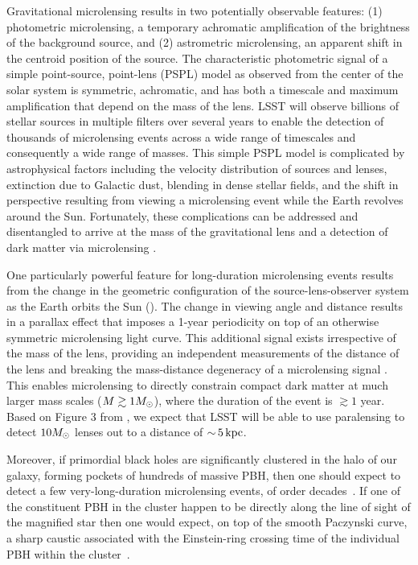 Gravitational microlensing results in two potentially observable features: (1) photometric microlensing, a temporary achromatic amplification of the brightness of the background source, and (2) astrometric microlensing, an apparent shift in the centroid position of the source.
The characteristic photometric signal of a simple point-source, point-lens (PSPL) model as observed from the center of the solar system is symmetric, achromatic, and has both a timescale and maximum amplification that depend on the mass of the lens.
LSST will observe billions of stellar sources in multiple filters over several years to enable the detection of thousands of microlensing events across a wide range of timescales and consequently a wide range of masses.
This simple PSPL model is complicated by astrophysical factors including the velocity distribution of sources and lenses, extinction due to Galactic dust, blending in dense stellar fields, and the shift in perspective resulting from viewing a microlensing event while the Earth revolves around the Sun.
Fortunately, these complications can be addressed and disentangled to arrive at the mass of the gravitational lens and a detection of dark matter via microlensing \citep{1405.3134,1509.04899}.

One particularly powerful feature for long-duration microlensing events results from the change in the geometric configuration of the source-lens-observer system as the Earth orbits the Sun ().
The change in viewing angle and distance results in a parallax effect that imposes a 1-year periodicity on top of an otherwise symmetric microlensing light curve.
This additional signal exists irrespective of the mass of the lens, providing an independent measurements of the distance of the lens and breaking the mass-distance degeneracy of a microlensing signal \citep[\eg,][]{1509.04899}.
This enables microlensing to directly constrain compact dark matter at much larger mass scales ($M \gtrsim 1M_\odot$), where the duration of the event is $\gtrsim 1$ year. 
Based on Figure 3 from \citet{1509.04899}, we expect that LSST will be able to use paralensing to detect $10M_\odot$ lenses out to a distance of $ {\sim}\,5 \mathrm{\,kpc}$.

Moreover, if primordial black holes are significantly clustered in the halo of our galaxy, forming pockets of hundreds of massive PBH, then one should expect to detect a few very-long-duration microlensing events, of order decades~\citep{Bellido:2017}. If one of the constituent PBH in the cluster happen to be directly along the line of sight of the magnified star then one would expect, on top of the smooth Paczynski curve, a sharp caustic associated with the Einstein-ring crossing time of the individual PBH within the cluster~\citep{Bellido:2018}.

